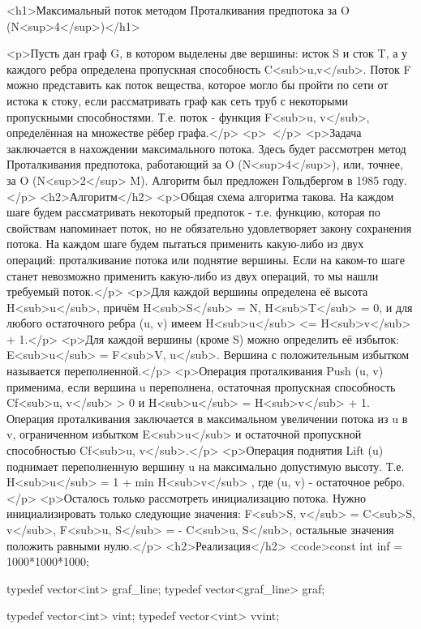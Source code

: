 <h1>Максимальный поток методом Проталкивания предпотока за O (N<sup>4</sup>)</h1>

<p>Пусть дан граф G, в котором выделены две вершины: исток S и сток T, а у каждого ребра определена пропускная способность C<sub>u,v</sub>. Поток F можно представить как поток вещества, которое могло бы пройти по сети от истока к стоку, если рассматривать граф как сеть труб с некоторыми пропускными способностями. Т.е. поток - функция F<sub>u, v</sub>, определённая на множестве рёбер графа.</p>
<p> </p>
<p>Задача заключается в нахождении максимального потока. Здесь будет рассмотрен метод Проталкивания предпотока, работающий за O (N<sup>4</sup>), или, точнее, за O (N<sup>2</sup> M). Алгоритм был предложен Гольдбергом в 1985 году.</p>
<h2>Алгоритм</h2>
<p>Общая схема алгоритма такова. На каждом шаге будем рассматривать некоторый предпоток - т.е. функцию, которая по свойствам напоминает поток, но не обязательно удовлетворяет закону сохранения потока. На каждом шаге будем пытаться применить какую-либо из двух операций: проталкивание потока или поднятие вершины. Если на каком-то шаге станет невозможно применить какую-либо из двух операций, то мы нашли требуемый поток.</p>
<p>Для каждой вершины определена её высота H<sub>u</sub>, причём H<sub>S</sub> = N, H<sub>T</sub> = 0, и для любого остаточного ребра (u, v) имеем H<sub>u</sub> <= H<sub>v</sub> + 1.</p>
<p>Для каждой вершины (кроме S) можно определить её избыток: E<sub>u</sub> = F<sub>V, u</sub>. Вершина с положительным избытком называется переполненной.</p>
<p>Операция проталкивания Push (u, v) применима, если вершина u переполнена, остаточная пропускная способность Cf<sub>u, v</sub> > 0 и H<sub>u</sub> = H<sub>v</sub> + 1. Операция проталкивания заключается в максимальном увеличении потока из u в v, ограниченном избытком E<sub>u</sub> и остаточной пропускной способностью Cf<sub>u, v</sub>.</p>
<p>Операция поднятия Lift (u) поднимает переполненную вершину u на максимально допустимую высоту. Т.е. H<sub>u</sub> = 1 + min { H<sub>v</sub> }, где (u, v) - остаточное ребро.</p>
<p>Осталось только рассмотреть инициализацию потока. Нужно инициализировать только следующие значения: F<sub>S, v</sub> = C<sub>S, v</sub>, F<sub>u, S</sub> = - C<sub>u, S</sub>, остальные значения положить равными нулю.</p>
<h2>Реализация</h2>
<code>const int inf = 1000*1000*1000;


typedef vector<int> graf_line;
typedef vector<graf_line> graf;

typedef vector<int> vint;
typedef vector<vint> vvint;


